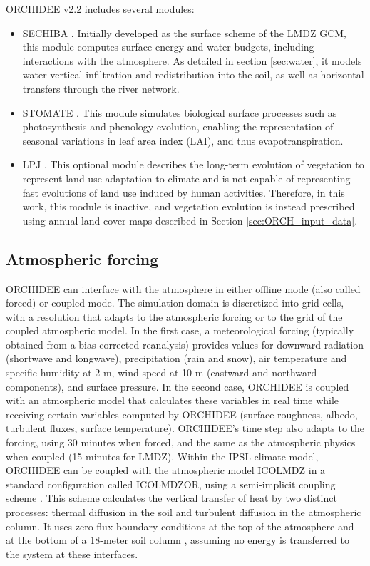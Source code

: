 ORCHIDEE v2.2 includes several modules:
\begin{itemize}
    \item SECHIBA \citep[\textit{Schématisation des Échanges Hydriques à l’Interface entre la Biosphère et l’Atmo\-sphère}][]{ducoudre_sechiba_1993}. Initially developed as the surface scheme of the LMDZ GCM, this module computes surface energy and water budgets, including interactions with the atmosphere. As detailed in section \ref{sec:water}, it models water vertical infiltration and redistribution into the soil, as well as horizontal transfers through the river network.
    \item STOMATE \citep{krinner_dynamic_2005}. This module simulates biological surface processes such as photosynthesis and phenology evolution, enabling the representation of seasonal variations in leaf area index (LAI), and thus evapotranspiration.
    \item LPJ \citep{sitch_evaluation_2003}. This optional module describes the long-term evolution of vegetation to represent land use adaptation to climate and is not capable of representing fast evolutions of land use induced by human activities. Therefore, in this work, this module is inactive, and vegetation evolution is instead prescribed using annual land-cover maps described in Section \ref{sec:ORCH_input_data}.
\end{itemize}

\subsection{Atmospheric forcing}
ORCHIDEE can interface with the atmosphere in either offline mode (also called forced) or coupled mode. The simulation domain is discretized into grid cells, with a resolution that adapts to the atmospheric forcing or to the grid of the coupled atmospheric model.
In the first case, a meteorological forcing (typically obtained from a bias-corrected reanalysis) provides values for downward radiation (shortwave and longwave), precipitation (rain and snow), air temperature and specific humidity at 2 m, wind speed at 10 m (eastward and northward components), and surface pressure. 
In the second case, ORCHIDEE is coupled with an atmospheric model that calculates these variables in real time while receiving certain variables computed by ORCHIDEE (surface roughness, albedo, turbulent fluxes, surface temperature). ORCHIDEE's time step also adapts to the forcing, using 30 minutes when forced, and the same as the atmospheric physics when coupled (15 minutes for LMDZ).
Within the IPSL climate model, ORCHIDEE can be coupled with the atmospheric model ICOLMDZ in a standard configuration called ICOLMDZOR, using a semi-implicit coupling scheme \citep{polcher_proposal_1998, Hourdin_phdthesis, hourdin_2002}. This scheme calculates the vertical transfer of heat by two distinct processes: thermal diffusion in the soil and turbulent diffusion in the atmospheric column. It uses zero-flux boundary conditions at the top of the atmosphere and at the bottom of a 18-meter soil column \citep{dufresne2009description}, assuming no energy is transferred to the system at these interfaces.


